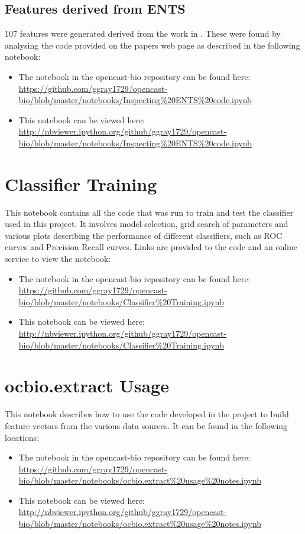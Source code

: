 \subsection{Features derived from ENTS}

107 features were generated derived from the work in \textcite{rodgers-melnick_predicting_2013}.
These were found by analysing the code provided on the papers web page as described in the following notebook:

\begin{itemize}
    \item The notebook in the opencast-bio repository can be found here: \url{https://github.com/ggray1729/opencast-bio/blob/master/notebooks/Inspecting%20ENTS%20code.ipynb}
        \item This notebook can be viewed here: \url{http://nbviewer.ipython.org/github/ggray1729/opencast-bio/blob/master/notebooks/Inspecting%20ENTS%20code.ipynb}
\end{itemize}

\section{Classifier Training}
\label{app:classtrain}

This notebook contains all the code that was run to train and test the classifier used in this project.
It involves model selection, grid search of parameters and various plots describing the performance of different classifiers, such as \ac{ROC} curves and Precision Recall curves.
Links are provided to the code and an online service to view the notebook:

\begin{itemize}
    \item The notebook in the opencast-bio repository can be found here: \url{https://github.com/ggray1729/opencast-bio/blob/master/notebooks/Classifier%20Training.ipynb}
        \item This notebook can be viewed here: \url{http://nbviewer.ipython.org/github/ggray1729/opencast-bio/blob/master/notebooks/Classifier%20Training.ipynb}
\end{itemize}

\section{ocbio.extract Usage}
\label{app:ocbio}

This notebook describes how to use the code developed in the project to build feature vectors from the various data sources.
It can be found in the following locations:

\begin{itemize}
    \item The notebook in the opencast-bio repository can be found here: \url{https://github.com/ggray1729/opencast-bio/blob/master/notebooks/ocbio.extract%20usage%20notes.ipynb}
    \item This notebook can be viewed here: \url{http://nbviewer.ipython.org/github/ggray1729/opencast-bio/blob/master/notebooks/ocbio.extract%20usage%20notes.ipynb}
\end{itemize}

